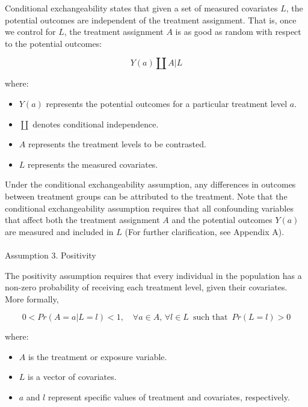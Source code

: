 \documentclass[
  single column]{article}
\makeatletter
\let\oldparagraph\paragraph
\renewcommand{\paragraph}{
    \@ifstar
      \xxxParagraphStar
      \xxxParagraphNoStar
  }
\newcommand{\xxxParagraphStar}[1]{\oldparagraph*{#1}\mbox{}}
\newcommand{\xxxParagraphNoStar}[1]{\oldparagraph{#1}\mbox{}}
\providecommand{\tightlist}{%
  \setlength{\itemsep}{0pt}\setlength{\parskip}{0pt}}\usepackage{longtable,booktabs,array}
\makeatother
\begin{document}
Conditional exchangeability states that given a set of measured
covariates \(L\), the potential outcomes are independent of the
treatment assignment. That is, once we control for \(L\), the treatment
assignment \(A\) is as good as random with respect to the potential
outcomes:

\[
Y(a) \coprod A | L
\]

where:

\begin{itemize}
\tightlist
\item
  \(Y(a)\) represents the potential outcomes for a particular treatment
  level \(a\).
\item
  \(\coprod\) denotes conditional independence.
\item
  \(A\) represents the treatment levels to be contrasted.
\item
  \(L\) represents the measured covariates.
\end{itemize}

Under the conditional exchangeability assumption, any differences in
outcomes between treatment groups can be attributed to the treatment.
Note that the conditional exchangeability assumption requires that all
confounding variables that affect both the treatment assignment \(A\)
and the potential outcomes \(Y(a)\) are measured and included in \(L\)
(For further clarification, see Appendix A).

\paragraph{Assumption 3. Positivity}\label{assumption-3.-positivity}

The positivity assumption requires that every individual in the
population has a non-zero probability of receiving each treatment level,
given their covariates. More formally,

\[
0 < Pr(A = a | L = l) < 1, \quad \forall a \in A, \, \forall l \in L \, \text{ such that } \, Pr(L = l) > 0
\]

where:

\begin{itemize}
\tightlist
\item
  \(A\) is the treatment or exposure variable.
\item
  \(L\) is a vector of covariates.
\item
  \(a\) and \(l\) represent specific values of treatment and covariates,
  respectively.
\end{itemize}
\end{document}
